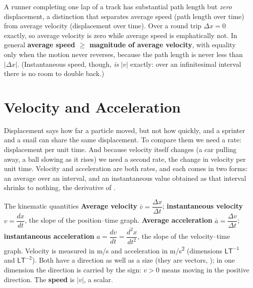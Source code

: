 \begin{figure}[htbp]
\centering
{}
\end{figure}

A runner completing one lap of a track has substantial path length but \emph{zero} displacement, a
distinction that separates average speed (path length over time) from average velocity (displacement over
time). Over a round trip $\Delta x=0$ exactly, so average velocity is zero while average speed is
emphatically not. In general \textbf{average speed $\ge$ magnitude of average velocity}, with
equality only when the motion never reverses, because the path length is never less than $|\Delta x|$.
(Instantaneous speed, though, \emph{is} $|v|$ exactly: over an infinitesimal interval there is no room
to double back.)


\section{Velocity and Acceleration}

Displacement says how far a particle moved, but not how quickly, and a sprinter and a snail can share the
same displacement. To compare them we need a rate: displacement per unit time. And because velocity
itself changes (a car pulling away, a ball slowing as it rises) we need a second rate, the change in
velocity per unit time. Velocity and acceleration are both rates, and each comes in two forms: an average
over an interval, and an instantaneous value obtained as that interval shrinks to nothing, the derivative
of .

\begin{defbox}{The kinematic quantities}
\textbf{Average velocity} $\bar v=\dfrac{\Delta x}{\Delta t}$; \textbf{instantaneous velocity}
$v=\dfrac{dx}{dt}$, the slope of the position--time graph. \textbf{Average acceleration}
$\bar a=\dfrac{\Delta v}{\Delta t}$; \textbf{instantaneous acceleration} $a=\dfrac{dv}{dt}=\dfrac{d^2x}{dt^2}$,
the slope of the velocity--time graph. Velocity is measured in \si{m/s} and acceleration in
\si{m/s^2} (dimensions $\mathsf{LT^{-1}}$ and $\mathsf{LT^{-2}}$). Both have a direction as well as a
size (they are vectors, ); in one dimension the direction is carried by the sign: $v>0$
means moving in the positive direction. The \textbf{speed} is
$|v|$, a scalar.
\end{defbox}

